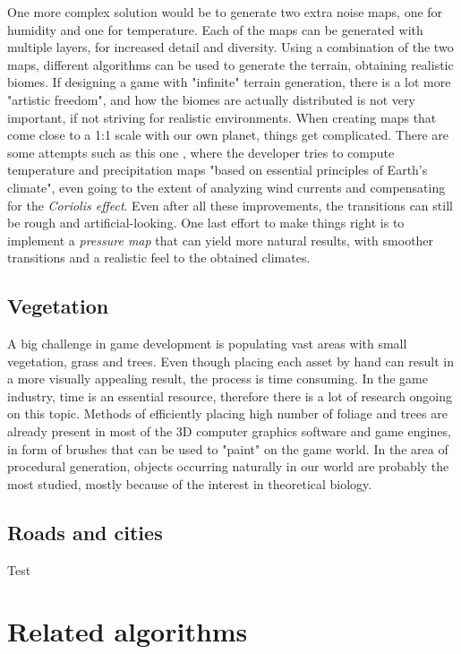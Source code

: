 One more complex solution would be to generate two extra noise maps, one for humidity and one for temperature. Each of the maps can be generated with multiple layers, for increased detail and diversity. Using a combination of the two maps, different algorithms can be used to generate the terrain, obtaining realistic biomes. If designing a game with "infinite" terrain generation, there is a lot more "artistic freedom", and how the biomes are actually distributed is not very important, if not striving for realistic environments. When creating maps that come close to a 1:1 scale with our own planet, things get complicated. There are some attempts such as this one \cite{biomes}, where the developer tries to compute temperature and precipitation maps "based on essential principles of Earth's climate", even going to the extent of analyzing wind currents and compensating for the \textit{Coriolis effect}. Even after all these improvements, the transitions can still be rough and artificial-looking. One last effort to make things right is to implement a \textit{pressure map} that can yield more natural results, with smoother transitions and a realistic feel to the obtained climates.

\subsection{Vegetation}

A big challenge in game development is populating vast areas with small vegetation, grass and trees. Even though placing each asset by hand can result in a more visually appealing result, the process is time consuming. In the game industry, time is an essential resource, therefore there is a lot of research ongoing on this topic. Methods of efficiently placing high number of foliage and trees are already present in most of the 3D computer graphics software and game engines, in form of brushes that can be used to "paint" on the game world. In the area of procedural generation, objects occurring naturally in our world are probably the most studied, mostly because of the interest in theoretical biology. 

\subsection{Roads and cities}

Test

\section{Related algorithms}

